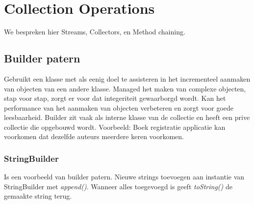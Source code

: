 \section{Collection Operations}
We bespreken hier Streams, Collectors, en Method chaining.

\subsection{Builder patern}
Gebruikt een klasse met als eenig doel te assisteren in het incrementeel aanmaken van objecten van een andere klasse.
Managed het maken van complexe objecten, stap voor stap, zorgt er voor dat integeriteit gewaarborgd wordt.
Kan het performance van het aanmaken van objecten verbeteren en zorgt voor goede leesbaarheid.
Builder zit vaak als interne klasse van de collectie en heeft een prive collectie die opgebouwd wordt.
Voorbeeld: Boek registratie applicatie kan voorkomen dat dezelfde auteurs meerdere keren voorkomen.

\subsubsection{StringBuilder}
Is een voorbeeld van builder patern.
Nieuwe strings toevoegen aan instantie van StringBuilder met \textit{append()}.
Wanneer alles toegevoegd is geeft \textit{toString()} de gemaakte string terug.

